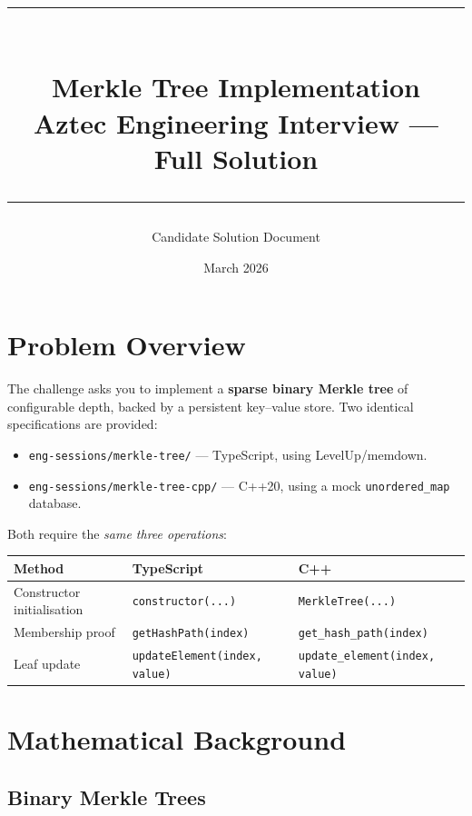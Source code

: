 \documentclass[12pt,a4paper]{article}
\title{
  \vspace{-1cm}
  {\color{aztecpurple}\rule{\linewidth}{2pt}}\\[0.4cm]
  \Huge\textbf{Merkle Tree Implementation}\\[0.3cm]
  \Large Aztec Engineering Interview — Full Solution\\[0.2cm]
  {\color{aztecpurple}\rule{\linewidth}{2pt}}
}
\author{Candidate Solution Document}
\date{March 2026}
\begin{document}
\maketitle
\tableofcontents
\newpage

\section{Problem Overview}

The challenge asks you to implement a \textbf{sparse binary Merkle tree} of
configurable depth, backed by a persistent key--value store.  Two identical
specifications are provided:

\begin{itemize}[leftmargin=1.5cm]
  \item \texttt{eng-sessions/merkle-tree/} — TypeScript, using LevelUp/memdown.
  \item \texttt{eng-sessions/merkle-tree-cpp/} — C++20, using a mock
        \texttt{unordered\_map} database.
\end{itemize}

Both require the \emph{same three operations}:

\begin{center}
\begin{tabular}{lll}
\toprule
\textbf{Method} & \textbf{TypeScript} & \textbf{C++} \\
\midrule
Constructor initialisation & \texttt{constructor(...)} & \texttt{MerkleTree(...)} \\
Membership proof & \texttt{getHashPath(index)} & \texttt{get\_hash\_path(index)} \\
Leaf update & \texttt{updateElement(index, value)} & \texttt{update\_element(index, value)} \\
\bottomrule
\end{tabular}
\end{center}

\section{Mathematical Background}

\subsection{Binary Merkle Trees}
\end{document}
